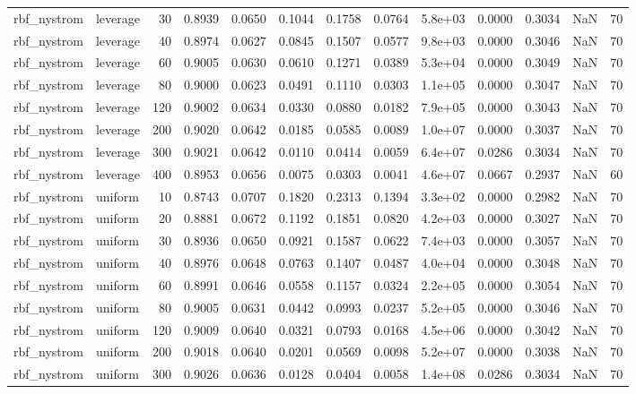 \begin{table}
\begin{tabular}{llrrrrrrlrrrr}
rbf\_nystrom & leverage & 30 & 0.8939 & 0.0650 & 0.1044 & 0.1758 & 0.0764 & 5.8e+03 & 0.0000 & 0.3034 & NaN & 70 \\
rbf\_nystrom & leverage & 40 & 0.8974 & 0.0627 & 0.0845 & 0.1507 & 0.0577 & 9.8e+03 & 0.0000 & 0.3046 & NaN & 70 \\
rbf\_nystrom & leverage & 60 & 0.9005 & 0.0630 & 0.0610 & 0.1271 & 0.0389 & 5.3e+04 & 0.0000 & 0.3049 & NaN & 70 \\
rbf\_nystrom & leverage & 80 & 0.9000 & 0.0623 & 0.0491 & 0.1110 & 0.0303 & 1.1e+05 & 0.0000 & 0.3047 & NaN & 70 \\
rbf\_nystrom & leverage & 120 & 0.9002 & 0.0634 & 0.0330 & 0.0880 & 0.0182 & 7.9e+05 & 0.0000 & 0.3043 & NaN & 70 \\
rbf\_nystrom & leverage & 200 & 0.9020 & 0.0642 & 0.0185 & 0.0585 & 0.0089 & 1.0e+07 & 0.0000 & 0.3037 & NaN & 70 \\
rbf\_nystrom & leverage & 300 & 0.9021 & 0.0642 & 0.0110 & 0.0414 & 0.0059 & 6.4e+07 & 0.0286 & 0.3034 & NaN & 70 \\
rbf\_nystrom & leverage & 400 & 0.8953 & 0.0656 & 0.0075 & 0.0303 & 0.0041 & 4.6e+07 & 0.0667 & 0.2937 & NaN & 60 \\
rbf\_nystrom & uniform & 10 & 0.8743 & 0.0707 & 0.1820 & 0.2313 & 0.1394 & 3.3e+02 & 0.0000 & 0.2982 & NaN & 70 \\
rbf\_nystrom & uniform & 20 & 0.8881 & 0.0672 & 0.1192 & 0.1851 & 0.0820 & 4.2e+03 & 0.0000 & 0.3027 & NaN & 70 \\
rbf\_nystrom & uniform & 30 & 0.8936 & 0.0650 & 0.0921 & 0.1587 & 0.0622 & 7.4e+03 & 0.0000 & 0.3057 & NaN & 70 \\
rbf\_nystrom & uniform & 40 & 0.8976 & 0.0648 & 0.0763 & 0.1407 & 0.0487 & 4.0e+04 & 0.0000 & 0.3048 & NaN & 70 \\
rbf\_nystrom & uniform & 60 & 0.8991 & 0.0646 & 0.0558 & 0.1157 & 0.0324 & 2.2e+05 & 0.0000 & 0.3054 & NaN & 70 \\
rbf\_nystrom & uniform & 80 & 0.9005 & 0.0631 & 0.0442 & 0.0993 & 0.0237 & 5.2e+05 & 0.0000 & 0.3046 & NaN & 70 \\
rbf\_nystrom & uniform & 120 & 0.9009 & 0.0640 & 0.0321 & 0.0793 & 0.0168 & 4.5e+06 & 0.0000 & 0.3042 & NaN & 70 \\
rbf\_nystrom & uniform & 200 & 0.9018 & 0.0640 & 0.0201 & 0.0569 & 0.0098 & 5.2e+07 & 0.0000 & 0.3038 & NaN & 70 \\
rbf\_nystrom & uniform & 300 & 0.9026 & 0.0636 & 0.0128 & 0.0404 & 0.0058 & 1.4e+08 & 0.0286 & 0.3034 & NaN & 70 \\

\end{tabular}
\end{table}
